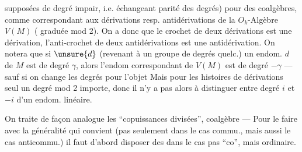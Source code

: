 supposées de degré impair, i.e. échangeant parité des degrés) pour des coalgèbres, comme correspondant aux dérivations resp. antidérivations de la $O_k$-Algèbre $V(M)$ ( graduée mod 2). On a donc que le crochet de deux dérivations est une dérivation, l'anti-crochet de deux antidérivations est une antidérivation. On notera que si $\unsure{d}$ (revenant à un groupe de degrés quelc.) un endom. $d$ de $M$ est de degré $\gamma$, alors l'endom correspondant de $V(M)$ est de degré $-\gamma$ --- sauf si on change les degrés  pour l'objet
\diagram{\[
\begin{array}{ll}
V(M_i)&=V(M)^i=V(M)_{-i}\\
\text{\textquotedbl}&\\
V(M^{-i})&
\end{array}
\]}
Mais pour les histoires de dérivations  seul un degré mod 2 importe, donc il n'y a pas alors à distinguer entre degré $i$ et $-i$ d'un endom. linéaire.

On traite de façon analogue les ``copuissances divisées'',  coalgèbre --- Pour le faire avec la généralité qui convient (pas seulement dans le cas commu., \deleted{\unsure{\&}} mais aussi le cas anticommu.) il faut d'abord disposer des  dans le cas pas ``co'', mais ordinaire.
